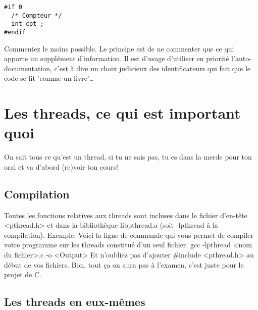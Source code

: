 \documentclass[a4paper]{article}
\begin{document}
\begin{lstlisting}
#if 0
  /* Compteur */
  int cpt ;
#endif
\end{lstlisting}
Commentez le moins possible. Le principe est de ne commenter que ce qui apporte un supplément d'information. Il est d'usage d'utiliser en priorité l'auto-documentation, c'est à dire un choix judicieux des identificateurs qui fait que le code se lit 'comme un livre'…
\section{Les threads, ce qui est important quoi}
On sait tous ce qu'est un thread, si tu ne sais pas, tu es dans la merde pour ton oral et va d'abord (re)voir ton cours!
\subsection{Compilation}
Toutes les fonctions relatives aux threads sont incluses dans le fichier d'en-tête <pthread.h> et dans la bibliothèque libpthread.a (soit -lpthread à la compilation).\newline
Exemple:\newline
Voici la ligne de commande qui vous permet de compiler votre programme sur les threads constitué d'un seul fichier.\newline
gcc -lpthread <nom du fichier>.c -o <Output>\newline
Et n'oubliez pas d'ajouter \#include <pthread.h> au début de vos fichiers.
Bon, tout ça on aura pas à l'examen, c'est juste pour le projet de C.
\subsection{Les threads en eux-mêmes}
\end{document}

